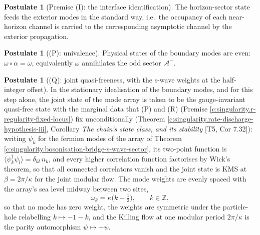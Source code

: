 \documentclass[11pt]{article}
\theoremstyle{definition}
\newtheorem{postulate}[theorem]{Postulate}
\theoremstyle{plain}
\providecommand{\Aod}{}\renewcommand{\Aod}{\mathcal{A}^{-}}
\providecommand{\Z}{}\renewcommand{\Z}{\mathbb{Z}}
\begin{document}
\begin{postulate}[Premise (I): the interface identification]\label{c:hawking.premise-i-interface-identification}
The horizon-sector state feeds the exterior modes in the standard way, i.e.\ the occupancy of each near-horizon channel is carried to the corresponding asymptotic channel by the exterior propagation.
\end{postulate}

\begin{postulate}[(P): univalence]\label{c:singularity.p-univalence}
Physical states of the boundary modes are even: $\omega \circ \alpha = \omega$, equivalently $\omega$ annihilates the odd sector $\Aod$.
\end{postulate}

\begin{postulate}[(Q): joint quasi-freeness, with the s-wave weights at the half-integer offset]\label{c:singularity.q-joint-quasi-freeness-s-wave}
In the stationary idealisation of the boundary modes, and for this step alone, the joint state of the mode array is taken to be the gauge-invariant quasi-free state with the marginal data that (P) and (R) (Premise \ref{c:singularity.r-regularity-fixed-locus}) fix unconditionally (Theorem \ref{c:singularity.rate-discharge-hypothesis-iii}, Corollary \emph{The chain's state class, and its stability} [T5, Cor 7.32]): writing $\psi_k$ for the fermion modes of the array of Theorem \ref{c:singularity.bosonisation-bridge-s-wave-sector}, its two-point function is $\langle \psi^\dagger_k \psi_l \rangle = \delta_{kl}\,n_k$, and every higher correlation function factorises by Wick's theorem, so that all connected correlators vanish and the joint state is KMS at $\beta = 2\pi/\kappa$ for the joint modular flow. The mode weights are evenly spaced with the array's sea level midway between two sites,
\[
\omega_k = \kappa\bigl(k + \tfrac12\bigr), \qquad k \in \Z ,
\]
so that no mode has zero weight, the weights are symmetric under the particle-hole relabelling $k \mapsto -1-k$, and the Killing flow at one modular period $2\pi/\kappa$ is the parity automorphism $\psi \mapsto -\psi$.


\end{postulate}
\end{document}
